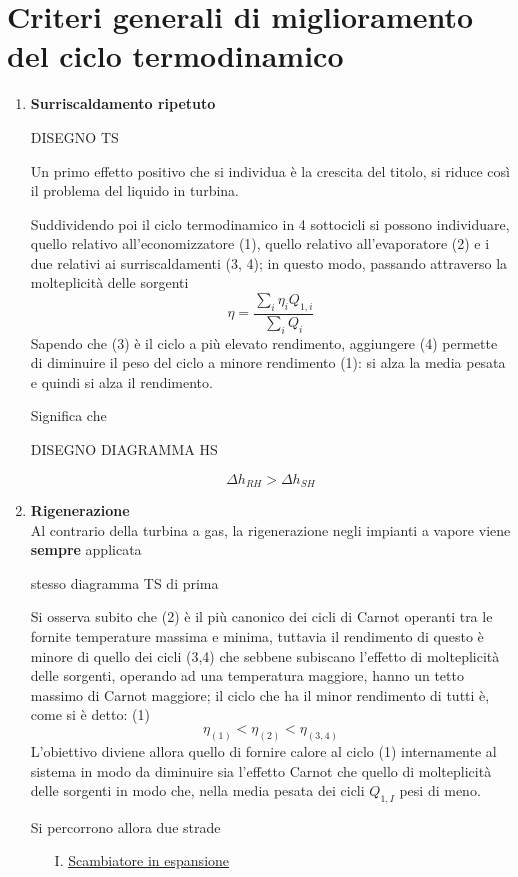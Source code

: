 \section{Criteri generali di miglioramento del ciclo termodinamico}
\begin{adjustwidth}{2in}{}
	\begin{enumerate}
		\item \textbf{Surriscaldamento ripetuto}
		
		DISEGNO TS
		
		Un primo effetto positivo che si individua è la crescita del titolo, si riduce così il problema del liquido in turbina. \newline 
		
		Suddividendo poi il ciclo termodinamico in 4 sottocicli si possono individuare, quello relativo all'economizzatore (1), quello relativo all'evaporatore (2) e i due relativi ai surriscaldamenti (3, 4); in questo modo, passando attraverso la molteplicità delle sorgenti
		\[\eta= \dfrac{\sum_i\eta_iQ_{1,i}}{\sum_iQ_i}\]
		Sapendo che (3) è il ciclo a più elevato rendimento, aggiungere (4) permette di diminuire il peso del ciclo a minore rendimento (1): si alza la media pesata e quindi si alza il rendimento. 
		
		Significa che 
		
		DISEGNO DIAGRAMMA HS
		
		\[\Delta h_{RH}>\Delta h_{SH}\]
		
		\item \textbf{Rigenerazione}\\
		Al contrario della turbina a gas, la rigenerazione negli impianti a vapore viene \textbf{sempre} applicata
		
		stesso diagramma TS di prima
		
		Si osserva subito che (2) è il più canonico dei cicli di Carnot operanti tra le fornite temperature massima e minima, tuttavia il rendimento di questo è minore di quello dei cicli (3,4) che sebbene subiscano l'effetto di molteplicità delle sorgenti, operando ad una temperatura maggiore, hanno un tetto massimo di Carnot maggiore; il ciclo che ha il minor rendimento di tutti è, come si è detto: (1)
		\[\eta_{(1)}<\eta_{(2)}<\eta_{(3,4)}\]
		L'obiettivo diviene allora quello di fornire calore al ciclo (1) internamente al sistema in modo da diminuire sia l'effetto Carnot che quello di molteplicità delle sorgenti in modo che, nella media pesata dei cicli $Q_{1,I}$ pesi di meno. 
		
		Si percorrono allora due strade
		\begin{enumerate}
			\item[I.] \underline{Scambiatore in espansione}
			

\end{enumerate}
\end{enumerate}
\end{adjustwidth}
